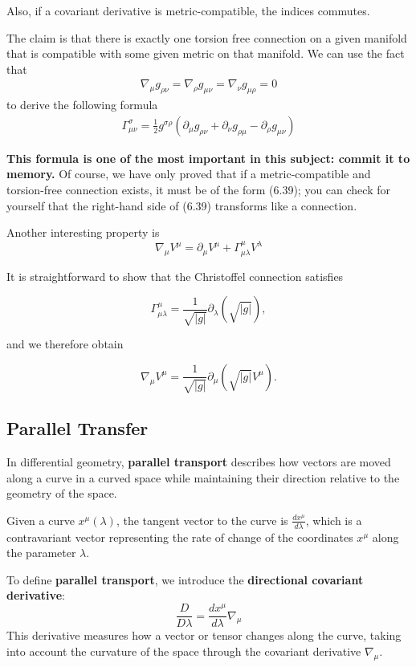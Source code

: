 \documentclass[11pt,letterpaper]{book}
\begin{document}
Also, if a covariant derivative is metric-compatible, the indices commutes. 

The claim is that there is exactly one torsion free connection on a given manifold that is compatible with some given metric on that manifold. We can use the fact that
\begin{align}
\nabla_{\mu} g_{\rho\nu} = \nabla_\rho g_{\mu\nu} = \nabla_\nu g_{\mu\rho} = 0
\end{align}
to derive the following formula
\begin{align}
\Gamma^\sigma_{\mu\nu} = \frac{1}{2} g^{\sigma\rho} \left( \partial_\mu g_{\rho\nu} + \partial_\nu g_{\rho\mu} - \partial_\rho g_{\mu\nu} \right)
\end{align}

\textbf{This formula is one of the most important in this subject: commit it to memory.} Of course, we have only proved that if a metric-compatible and torsion-free connection exists, it must be of the form (6.39); you can check for yourself that the right-hand side of (6.39) transforms like a connection.

Another interesting property is
\[
\nabla_\mu V^\mu = \partial_\mu V^\mu + \Gamma^\mu_{\mu\lambda} V^\lambda
\]

It is straightforward to show that the Christoffel connection satisfies

\[
\Gamma^\mu_{\mu\lambda} = \frac{1}{\sqrt{|g|}} \partial_\lambda (\sqrt{|g|}),
\]

and we therefore obtain

\[
\nabla_\mu V^\mu = \frac{1}{\sqrt{|g|}} \partial_\mu (\sqrt{|g|} V^\mu).
\]



\subsection{Parallel Transfer}
In differential geometry, \textbf{parallel transport} describes how vectors are moved along a curve in a curved space while maintaining their direction relative to the geometry of the space. 

Given a curve \( x^\mu(\lambda) \), the tangent vector to the curve is \( \frac{dx^\mu}{d\lambda} \), which is a contravariant vector representing the rate of change of the coordinates \( x^\mu \) along the parameter \( \lambda \).

To define \textbf{parallel transport}, we introduce the \textbf{directional covariant derivative}:
\[
\frac{D}{D\lambda} = \frac{dx^\mu}{d\lambda} \nabla_\mu
\]
This derivative measures how a vector or tensor changes along the curve, taking into account the curvature of the space through the covariant derivative \( \nabla_\mu \).
\end{document}
